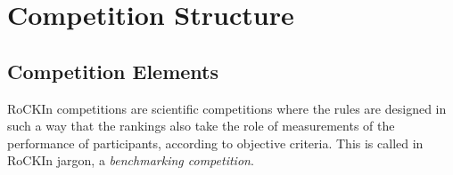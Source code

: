 \newpage
\section{Competition Structure}
\label{sec:CompetitionStructure}



\subsection{Competition Elements}
\label{ssec:RoawCompetitionElements}

RoCKIn competitions are scientific competitions where the rules are designed in such a way that the rankings also take the role of measurements of the performance of participants, according to objective criteria. This is called in RoCKIn jargon, a \emph{benchmarking competition}.

